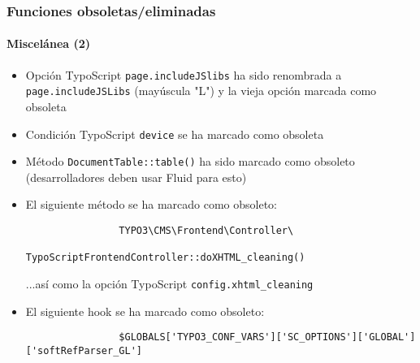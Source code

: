 \begin{frame}[fragile]
	\frametitle{Funciones obsoletas/eliminadas}
	\framesubtitle{Miscelánea (2)}

	\begin{itemize}
		\item Opción TypoScript \texttt{page.includeJSlibs} ha sido renombrada a\newline
			\texttt{page.includeJSLibs} (mayúscula "L") y la vieja opción marcada como obsoleta

		\item Condición TypoScript \texttt{device} se ha marcado como obsoleta

		\item Método \texttt{DocumentTable::table()} ha sido marcado como obsoleto\newline
			\small(desarrolladores deben usar Fluid para esto)\normalsize

		\item El siguiente método se ha marcado como obsoleto:
			\begin{lstlisting}
				TYPO3\CMS\Frontend\Controller\
				    TypoScriptFrontendController::doXHTML_cleaning()
			\end{lstlisting}
			...así como la opción TypoScript
			\small
				\texttt{config.xhtml\_cleaning}
			\normalsize

		\item El siguiente hook se ha marcado como obsoleto:
			\begin{lstlisting}
				$GLOBALS['TYPO3_CONF_VARS']['SC_OPTIONS']['GLOBAL']['softRefParser_GL']
			\end{lstlisting}

	\end{itemize}

\end{frame}


